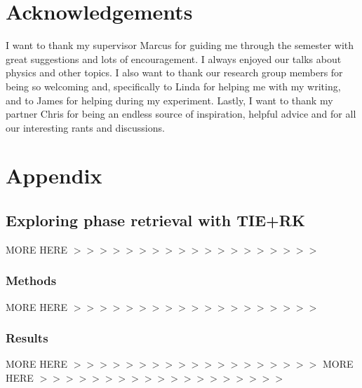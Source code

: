 \documentclass[10pt, a4paper, singlespacing]{report}
\newenvironment{Figure}
    {\par\medskip\noindent\minipage{\linewidth}}
    {\endminipage\par\medskip}
\begin{document}
\chapter{Acknowledgements}\label{Acknowledgements}

I want to thank my supervisor Marcus for guiding me through the semester with great suggestions and lots of encouragement. I always enjoyed our talks about physics and other topics. I also want to thank our research group members for being so welcoming and, specifically to Linda for helping me with my writing, and to James for helping during my experiment. Lastly, I want to thank my partner Chris for being an endless source of inspiration, helpful advice and for all our interesting rants and discussions.  

\chapter{Appendix}\label{Appendix}
\section{Exploring phase retrieval with TIE+RK}\label{Aborted}
MORE HERE $>>>>>>>>>>>>>>>>>>>$
\subsection{Methods}
MORE HERE $>>>>>>>>>>>>>>>>>>>$

\subsection{Results}
MORE HERE $>>>>>>>>>>>>>>>>>>>$
MORE HERE $>>>>>>>>>>>>>>>>>>>$


\end{document}
